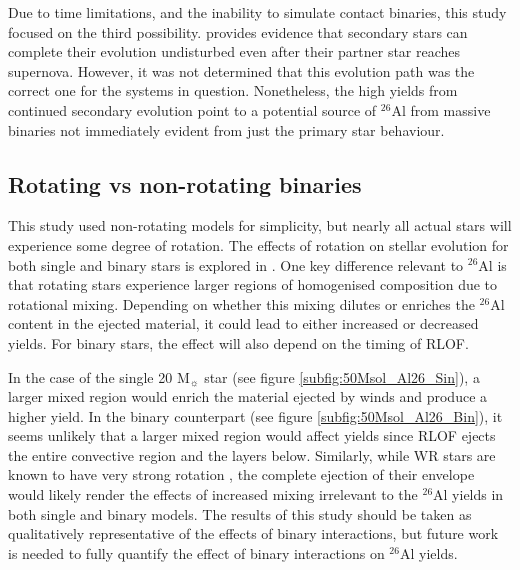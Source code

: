 Due to time limitations, and the inability to simulate contact binaries\footnotemark, this study focused on the third possibility.
\cite{2015A&A...584A..11L} provides evidence that secondary stars can complete their evolution undisturbed even after their partner star reaches supernova. However, it was not determined that this evolution path was the correct one for the systems in question.
Nonetheless, the high yields from continued secondary evolution point to a potential source of $^{26}$Al from massive binaries not immediately evident from just the primary star behaviour.

\subsection{Rotating vs non-rotating binaries}

This study used non-rotating models for simplicity, but nearly all actual stars will experience some degree of rotation.
The effects of rotation on stellar evolution for both single and binary stars is explored in \cite{2019EAS....82..137M}.
One key difference relevant to $^{26}$Al is that rotating stars experience larger regions of homogenised composition due to rotational mixing.
Depending on whether this mixing dilutes or enriches the $^{26}$Al content in the ejected material, it could lead to either increased or decreased yields. For binary stars, the effect will also depend on the timing of RLOF.

In the case of the single 20 M$_{\sun}$ star (see figure \ref{subfig:50Msol_Al26_Sin}), a larger mixed region would enrich the material ejected by winds and produce a higher yield. In the binary counterpart (see figure \ref{subfig:50Msol_Al26_Bin}), it seems unlikely that a larger mixed region would affect yields since RLOF ejects the entire convective region and the layers below.
Similarly, while WR stars are known to have very strong rotation \citep{Carroll2007}, the complete ejection of their envelope would likely render the effects of increased mixing irrelevant to the $^{26}$Al yields in both single and binary models.
The results of this study should be taken as qualitatively representative of the effects of binary interactions, but future work is needed to fully quantify the effect of binary interactions on $^{26}$Al yields.